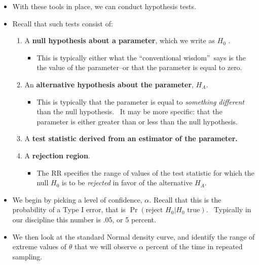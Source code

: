 \documentclass[11pt]{article}
\begin{document}
\begin{itemize}
\item With these tools in place, we can conduct hypothesis tests. \ 

\item Recall that such tests consist of:

\begin{enumerate}
\item A \textbf{null hypothesis about a parameter}, which we write as $H_{0}$%
.

\begin{itemize}
\item This is typically either what the \textquotedblleft conventional
wisdom\textquotedblright\ says is the the value of the parameter--or that
the parameter is equal to zero.
\end{itemize}

\item An \textbf{alternative hypothesis about the parameter}, $H_{A}$.

\begin{itemize}
\item This is typically that the parameter is equal to \textit{something
different }than the null hypothesis. \ It may be more specific: that the
parameter is either greater than or less than the null hypothesis.
\end{itemize}

\item A \textbf{test statistic derived from an estimator of the parameter.}

\item A \textbf{rejection region}.

\begin{itemize}
\item The RR specifies the range of values of the test statistic for which
the null $H_{0}$ is to be \textit{rejected }in favor of the alternative $%
H_{A}$.
\end{itemize}
\end{enumerate}

\item We begin by picking a level of confidence, $\alpha .$ Recall that this
is the probability of a Type I error, that is $\Pr \left( \text{reject }%
H_{0}|H_{0}\text{ true}\right) .$ \ Typically in our discipline this number
is .05, or 5 percent.

\item We then look at the standard Normal density curve, and identify the
range of extreme values of $\widehat{\theta }$ that we will observe $\alpha $
percent of the time in repeated sampling. \ 


\end{itemize}
\end{document}
